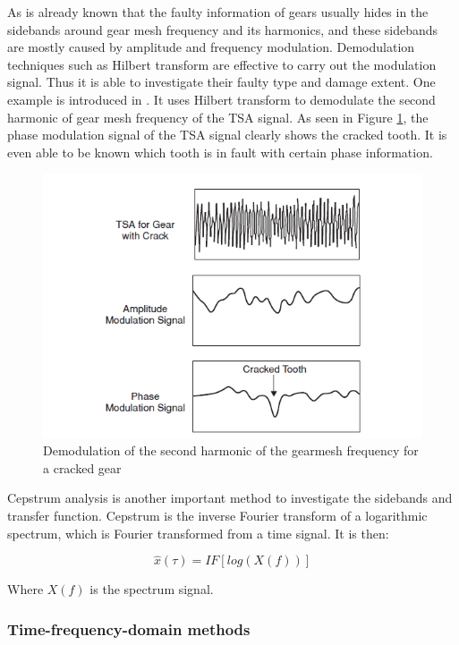 As is already known that the faulty information of gears usually hides in the sidebands around gear mesh frequency and its harmonics, and these sidebands are mostly caused by amplitude and frequency modulation. Demodulation techniques such as Hilbert transform are effective to carry out the modulation signal. Thus it is able to investigate their faulty type and damage extent.
One example is introduced in \cite{mc4}. It uses Hilbert transform to demodulate the second harmonic of gear mesh frequency of the TSA signal. As seen in Figure \ref{demodulation}, the phase modulation signal of the TSA signal clearly shows the cracked tooth. It is even able to be known which tooth is in fault with certain phase information.

\begin{figure}
	\centering
	\includegraphics{demodulation}
	\caption{Demodulation of the second harmonic of the gearmesh frequency for a cracked gear \cite{mc4}}
	\label{demodulation}
\end{figure}

Cepstrum analysis is another important method to investigate the sidebands and transfer function. Cepstrum is the inverse Fourier transform of a logarithmic spectrum, which is Fourier transformed from a time signal. It is then:

\begin{equation}
\hat{x}(\tau) = IF[log(X(f))]
\end{equation}

Where $X(f)$ is the spectrum signal.

\subsubsection{Time-frequency-domain methods}

